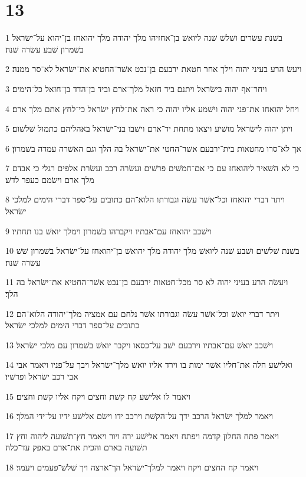 \chapter{13}

\par 1 בשׁנת עשׂרים ושׁלשׁ שׁנה ליואשׁ בן־אחזיהו מלך יהודה מלך יהואחז בן־יהוא על־ישׂראל בשׁמרון שׁבע עשׂרה שׁנה׃
\par 2 ויעשׂ הרע בעיני יהוה וילך אחר חטאת ירבעם בן־נבט אשׁר־החטיא את־ישׂראל לא־סר ממנה׃
\par 3 ויחר־אף יהוה בישׂראל ויתנם ביד חזאל מלך־ארם וביד בן־הדד בן־חזאל כל־הימים׃
\par 4 ויחל יהואחז את־פני יהוה וישׁמע אליו יהוה כי ראה את־לחץ ישׂראל כי־לחץ אתם מלך ארם׃
\par 5 ויתן יהוה לישׂראל מושׁיע ויצאו מתחת יד־ארם וישׁבו בני־ישׂראל באהליהם כתמול שׁלשׁום׃
\par 6 אך לא־סרו מחטאות בית־ירבעם אשׁר־החטי את־ישׂראל בה הלך וגם האשׁרה עמדה בשׁמרון׃
\par 7 כי לא השׁאיר ליהואחז עם כי אם־חמשׁים פרשׁים ועשׂרה רכב ועשׂרת אלפים רגלי כי אבדם מלך ארם וישׂמם כעפר לדשׁ׃
\par 8 ויתר דברי יהואחז וכל־אשׁר עשׂה וגבורתו הלוא־הם כתובים על־ספר דברי הימים למלכי ישׂראל׃
\par 9 וישׁכב יהואחז עם־אבתיו ויקברהו בשׁמרון וימלך יואשׁ בנו תחתיו׃
\par 10 בשׁנת שׁלשׁים ושׁבע שׁנה ליואשׁ מלך יהודה מלך יהואשׁ בן־יהואחז על־ישׂראל בשׁמרון שׁשׁ עשׂרה שׁנה׃
\par 11 ויעשׂה הרע בעיני יהוה לא סר מכל־חטאות ירבעם בן־נבט אשׁר־החטיא את־ישׂראל בה הלך׃
\par 12 ויתר דברי יואשׁ וכל־אשׁר עשׂה וגבורתו אשׁר נלחם עם אמציה מלך־יהודה הלוא־הם כתובים על־ספר דברי הימים למלכי ישׂראל׃
\par 13 וישׁכב יואשׁ עם־אבתיו וירבעם ישׁב על־כסאו ויקבר יואשׁ בשׁמרון עם מלכי ישׂראל׃
\par 14 ואלישׁע חלה את־חליו אשׁר ימות בו וירד אליו יואשׁ מלך־ישׂראל ויבך על־פניו ויאמר אבי אבי רכב ישׂראל ופרשׁיו׃
\par 15 ויאמר לו אלישׁע קח קשׁת וחצים ויקח אליו קשׁת וחצים׃
\par 16 ויאמר למלך ישׂראל הרכב ידך על־הקשׁת וירכב ידו וישׂם אלישׁע ידיו על־ידי המלך׃
\par 17 ויאמר פתח החלון קדמה ויפתח ויאמר אלישׁע ירה ויור ויאמר חץ־תשׁועה ליהוה וחץ תשׁועה בארם והכית את־ארם באפק עד־כלה׃
\par 18 ויאמר קח החצים ויקח ויאמר למלך־ישׂראל הך־ארצה ויך שׁלשׁ־פעמים ויעמד׃
